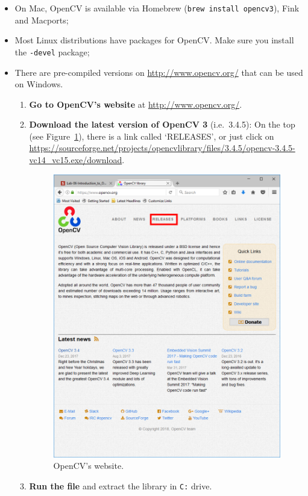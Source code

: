 \documentclass[english,a4paper,12pt,oneside]{article}
\begin{document}
\begin{itemize}
	\item On Mac, OpenCV is available via Homebrew (\verb+brew install opencv3+), Fink and Macports;
 \item Most Linux distributions have packages for OpenCV. Make sure you install the \verb+-devel+ package;
 \item There are pre-compiled versions on \url{http://www.opencv.org/} that can be used on Windows. 
	 \begin{enumerate}
	\item \textbf{Go to OpenCV's website} at \url{http://www.opencv.org/}. 
	\item \textbf{Download the latest version of OpenCV 3} (i.e.~3.4.5): On the top (see Figure~\ref{fig:main_page}), there is a link called `RELEASES', or just click on \url{https://sourceforge.net/projects/opencvlibrary/files/3.4.5/opencv-3.4.5-vc14_vc15.exe/download}. 
		\begin{figure}[tbp]
			\centering
			\includegraphics[width=\textwidth]{opencv_mainpage.png}
			\caption{\label{fig:main_page}OpenCV's website.}
		\end{figure}
	\item \textbf{Run the file} and extract the library in \verb+C:+ drive. %


\end{enumerate}
\end{itemize}
\end{document}
